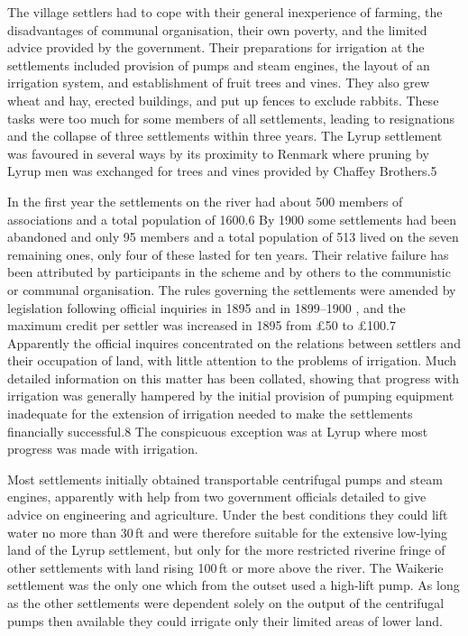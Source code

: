 The village settlers had to cope with their general inexperience of
farming, the disadvantages of communal organisation, their own
poverty, and the limited advice provided by the government.  Their
preparations for irrigation at the settlements included provision of
pumps and steam engines, the layout of an irrigation system, and
establishment of fruit trees and vines.  They also grew wheat and hay,
erected buildings, and put up fences to exclude rabbits.  These tasks
were too much for some members of all settlements, leading to
resignations and the collapse of three settlements within three years.
The Lyrup settlement was favoured in several ways by its proximity to
Renmark where pruning by Lyrup men was exchanged for trees and vines
provided by Chaffey Brothers.5

In the first year the settlements on the river had about 500 members
of associations and a total population of 1600.6 By 1900 some
settlements had been abandoned and only 95 members and a total
population of 513 lived on the seven remaining ones, only four of
these lasted for ten years.  Their relative failure has been
attributed by participants in the scheme and by others to the
communistic or communal organisation.  The rules governing the
settlements were amended by legislation following official inquiries
in 1895 and in 1899--1900 , and the maximum credit per settler was
increased in 1895 from \pounds50 to \pounds100.7 Apparently the
official inquires concentrated on the relations between settlers and
their occupation of land, with little attention to the problems of
irrigation.  Much detailed information on this matter has been
collated, showing that progress with irrigation was generally hampered
by the initial provision of pumping equipment inadequate for the
extension of irrigation needed to make the settlements financially
successful.8 The conspicuous exception was at Lyrup where most
progress was made with irrigation.

Most settlements initially obtained transportable centrifugal pumps
and steam engines, apparently with help from two government officials
detailed to give advice on engineering and agriculture.  Under the
best conditions they could lift water no more than 30\,ft and were
therefore suitable for the extensive low-lying land of the Lyrup
settlement, but only for the more restricted riverine fringe of other
settlements with land rising 100\,ft or more above the river.  The
Waikerie settlement was the only one which from the outset used a
high-lift pump.  As long as the other settlements were dependent
solely on the output of the centrifugal pumps then available they
could irrigate only their limited areas of lower land.

